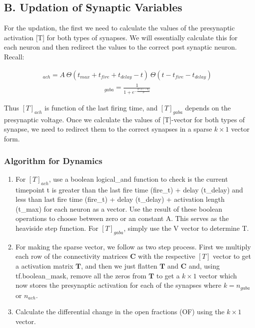 \documentclass[10pt,letterpaper]{article}
\begin{document}
\subsection*{B. Updation of Synaptic Variables}

For the updation, the first we need to calculate the values of the presynaptic activation [T] for both types of synapses. We will essentially calculate this for each neuron and then redirect the values to the correct post synaptic neuron. Recall:

\begin{eqnarray}[T]_{ach} = A\ \Theta(t_{max}+t_{fire}+t_{delay}-t)\ \Theta(t-t_{fire}-t_{delay})\end{eqnarray}
\begin{eqnarray}[T]_{gaba} = \frac{1}{1+e^{-\frac{V(t)-V_0}{\sigma}}}\end{eqnarray}

Thus $[T]_{ach}$ is function of the last firing time, and $[T]_{gaba}$ depends on the presynaptic voltage. Once we calculate the values of [T]-vector for both types of synapse, we need to redirect them to the correct synapses in a sparse $k\times1$ vector form. 

\subsubsection*{Algorithm for Dynamics}

\begin{enumerate}
\item  For $[T]_{ach}$, use a boolean logical\_and function to check is the current timepoint t is greater than the last fire time (fire\_t) + delay (t\_delay) and less than last fire time (fire\_t) + delay (t\_delay) + activation length (t\_max) for each neuron as a vector. Use the result of these boolean operations to choose between zero or an constant A. This serves as the heaviside step function. For $[T]_{gaba}$, simply use the V vector to determine T.
\item For making the sparse vector, we follow as two step process. First we multiply each row of the connectivity matrices $\mathbf{C}$ with the respective $[T]$ vector to get a activation matrix $\mathbf{T}$, and then we just flatten $\mathbf{T}$ and $\mathbf{C}$ and, using tf.boolean\_mask, remove all the zeros from $\mathbf{T}$ to get a $k\times1$ vector which now stores the presynaptic activation for each of the synapses where $k=n_{gaba}$ or $n_{ach}$.
\item Calculate the differential change in the open fractions (OF) using the $k\times1$ vector.
\end{enumerate}
\end{document}
